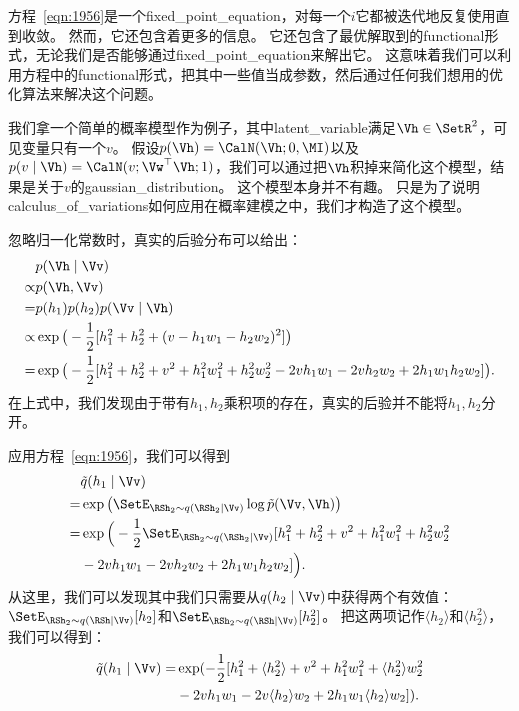 方程~\eqref{eqn:1956}是一个\gls{fixed_point_equation}，对每一个$i$它都被迭代地反复使用直到收敛。
然而，它还包含着更多的信息。
它还包含了最优解取到的\gls{functional}形式，无论我们是否能够通过\gls{fixed_point_equation}来解出它。
这意味着我们可以利用方程中的\gls{functional}形式，把其中一些值当成参数，然后通过任何我们想用的优化算法来解决这个问题。


我们拿一个简单的概率模型作为例子，其中\gls{latent_variable}满足$\Vh\in\SetR^2$，可见变量只有一个$v$。
假设$p(\Vh) = \CalN(\Vh;0,\MI)$以及$p(v\mid\Vh) = \CalN(v;\Vw^{\top}\Vh;1)$，我们可以通过把$\Vh$积掉来简化这个模型，结果是关于$v$的\gls{gaussian_distribution}。
这个模型本身并不有趣。
只是为了说明\gls{calculus_of_variations}如何应用在概率建模之中，我们才构造了这个模型。



忽略归一化常数时，真实的后验分布可以给出：
\begin{align}
	\label{eqn:1957}
   & p(\Vh\mid\Vv)\\
 \propto & p(\Vh, \Vv)\\
 = & p(h_1) p(h_2) p(\Vv\mid\Vh)\\
 \propto & \exp \big(-\frac{1}{2} [h_1^2 + h_2^2 + (v-h_1w_1 - h_2w_2)^2]\big)\\
 = & \exp \big( - \frac{1}{2} [h_1^2 + h_2^2 + v^2 + h_1^2w_1^2 + h_2^2w_2^2 - 2vh_1w_1 - 2vh_2w_2 + 2h_1w_1h_2w_2] \big).
\end{align}
在上式中，我们发现由于带有$h_1,h_2$乘积项的存在，真实的后验并不能将$h_1,h_2$分开。



应用方程~\eqref{eqn:1956}，我们可以得到
\begin{align}
\label{eqn:1962}
& \tilde{q}(h_1\mid\Vv)\\ 
= & \exp\big(\SetE_{\RSh_2\sim q(\RSh_2\mid\Vv)} \log \tilde{p}(\Vv,\Vh)\big) \\
= & \exp\Big( -\frac{1}{2} \SetE_{\RSh_2\sim q(\RSh_2\mid\Vv)} [h_1^2 + h_2^2 + v^2 + h_1^2w_1^2 + h_2^2w_2^2 \\
& -2vh_1w_1 - 2vh_2w_2 + 2h_1w_1h_2w_2]\Big).
\end{align}
从这里，我们可以发现其中我们只需要从$q(h_2\mid \Vv)$中获得两个有效值：
$\SetE_{\RSh_2\sim q(\RSh\mid\Vv)}[h_2]$和$\SetE_{\RSh_2\sim q(\RSh\mid\Vv)}[h_2^2]$。
把这两项记作$\langle h_2 \rangle$和$\langle h_2^2 \rangle$，我们可以得到：
\begin{align}
\label{eqn:1966}
\tilde{q}(h_1\mid\Vv) = & \exp(-\frac{1}{2} [h_1^2 + \langle h_2^2 \rangle  + v^2 + h_1^2w_1^2 + \langle h_2^2 \rangle w_2^2 
\\ &	-2vh_1w_1 - 2v\langle h_2 \rangle w_2 + 2h_1w_1\langle h_2 \rangle w_2]).	
\end{align}


